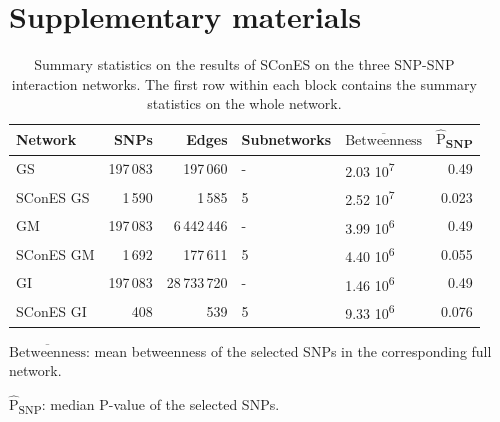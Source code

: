 \documentclass[twocolumn, 10pt]{article}
\newcommand{\mean}[1]{$\overline{\mbox{#1}}$}
\newcommand{\median}[1]{$\hat{\mbox{#1}}$}
\begin{document}



\clearpage
\setcounter{figure}{0}
\setcounter{section}{0}
\setcounter{table}{0}

\section*{Supplementary materials}

\begin{table}[htbp]
\begin{threeparttable}
\caption{\label{tab:snp_solutions}
Summary statistics on the results of SConES on the three SNP-SNP interaction networks. The first row within each block contains the summary statistics on the whole network.}
\centering
\begin{tabular}{lrrllr}
Network & SNPs & Edges & Subnetworks & \mean{Betweenness} & \median{P}\textsubscript{SNP}\\
\hline
GS & 197\,083 & 197\,060 & - & 2.03 \texttimes{} 10\textsuperscript{7} & 0.49\\
SConES GS & 1\,590 & 1\,585 & 5 & 2.52 \texttimes{} 10\textsuperscript{7} & 0.023\\
\hline
GM & 197\,083 & 6\,442\,446 & - & 3.99 \texttimes{} 10\textsuperscript{6} & 0.49\\
SConES GM & 1\,692 & 177\,611 & 5 & 4.40 \texttimes{} 10\textsuperscript{6} & 0.055\\
\hline
GI & 197\,083 & 28\,733\,720 & - & 1.46 \texttimes{} 10\textsuperscript{6} & 0.49\\
SConES GI & 408 & 539 & 5 & 9.33 \texttimes{} 10\textsuperscript{6} & 0.076\\
\end{tabular}
\begin{tablenotes}
\item \mean{Betweenness}: mean betweenness of the selected SNPs in the corresponding full network.
\item \median{P}\textsubscript{SNP}: median P-value of the selected SNPs.
\end{tablenotes}
\end{threeparttable}
\end{table}
\end{document}
